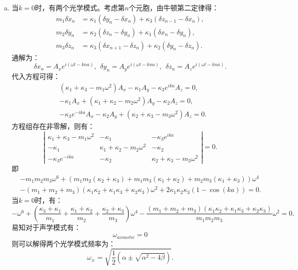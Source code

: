 \documentclass[reqno,a4paper,12pt]{amsart}
\begin{document}
\begin{tcolorbox}[breakable, colback = black!5!white, colframe = black]
\begin{enumerate}[(a)]
\item 当$k=0$时，有两个光学模式。考虑第$n$个元胞，由牛顿第二定律得：
\begin{align*}
	m_1\delta \ddot{x}_n &= \kappa_1(\delta y_n - \delta x_n) + \kappa_3(\delta z_{n-1} - \delta x_n), \\
	m_2\delta \ddot{y}_n &= \kappa_2(\delta z_n - \delta y_n) + \kappa_1(\delta x_n - \delta y_n), \\
	m_3\delta \ddot{z}_n &= \kappa_3(\delta x_{n+1} - \delta z_n) + \kappa_2(\delta y_n - \delta z_n).
\end{align*}
通解为：
\[
	\delta x_n = A_xe^{i(\omega t- kna)}, ~~ \delta y_n = A_ye^{i(\omega t- kna)}, ~~ \delta z_n = A_ze^{i(\omega t- kna)}.
\]
代入方程可得：
\begin{align*}
	&(\kappa_1+\kappa_3-m_1\omega^2)A_x - \kappa_1A_y - \kappa_3e^{ika}A_z = 0, \\
	&-\kappa_1 A_x + (\kappa_1+\kappa_2-m_2\omega^2)A_y - \kappa_2A_z = 0, \\
	&-\kappa_3 e^{-ika}A_x - \kappa_2A_y + (\kappa_2+\kappa_3-m_3\omega^2)A_z = 0.
\end{align*}
方程组存在非零解，则有：
\[
	\left\vert\begin{matrix}
		\kappa_1+\kappa_3-m_1\omega^2 & -\kappa_1 & -\kappa_3e^{ika} \\
		-\kappa_1 & \kappa_1+\kappa_2-m_2\omega^2 & -\kappa_2 \\
		-\kappa_3e^{-ika} & -\kappa_2 & \kappa_2+\kappa_3-m_3\omega^2
	\end{matrix}\right\vert = 0.
\]
即
\begin{align*}
	&-m_1m_2m_3\omega^6 + (m_1m_2(\kappa_2+\kappa_3) + m_1m_3(\kappa_1+\kappa_2) + m_2m_3(\kappa_1+\kappa_3))\omega^4 \\
	&- (m_1+m_2+m_3)(\kappa_1\kappa_2+\kappa_1\kappa_3+\kappa_2\kappa_3)\omega^2 + 2\kappa_1\kappa_2\kappa_3(1-\cos(ka)) = 0.
\end{align*}
当$k=0$时，有：
\[
	-\omega^6 + \left( \frac{\kappa_3+\kappa_1}{m_1} + \frac{\kappa_1+\kappa_2}{m_2} + \frac{\kappa_2+\kappa_3}{m_3} \right)\omega^4 - \frac{(m_1+m_2+m_3)(\kappa_1\kappa_2+\kappa_1\kappa_3+\kappa_2\kappa_3)}{m_1m_2m_3}\omega^2 = 0.
\]
易知对于声学模式有：
\[
	\omega_{acoustic} = 0
\]
则可以解得两个光学模式频率为：
\[
	\omega_{\pm} = \sqrt{\frac{1}{2}(\alpha \pm \sqrt{\alpha^2-4\beta})}.
\]
\end{enumerate}
\end{tcolorbox}
\end{document}
